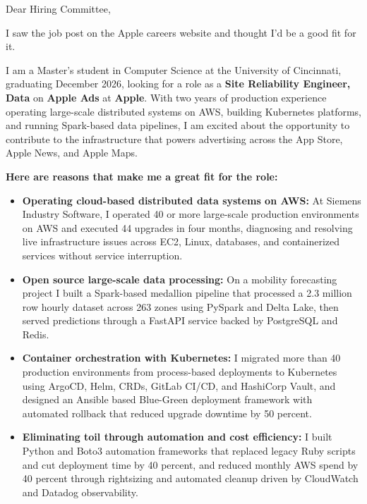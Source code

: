 \documentclass[11pt]{letter}
\date{}
\begin{document}
\begin{letter}{}

\opening{Dear Hiring Committee,}

I saw the job post on the Apple careers website and thought I'd be a good fit for it.

I am a Master's student in Computer Science at the University of Cincinnati, graduating December 2026, looking for a role as a \textbf{Site Reliability Engineer, Data} on \textbf{Apple Ads} at \textbf{Apple}. With two years of production experience operating large-scale distributed systems on AWS, building Kubernetes platforms, and running Spark-based data pipelines, I am excited about the opportunity to contribute to the infrastructure that powers advertising across the App Store, Apple News, and Apple Maps.

\textbf{Here are reasons that make me a great fit for the role:}

\begin{itemize}[leftmargin=*, itemsep=0.45em]
    \item \textbf{Operating cloud-based distributed data systems on AWS:} At Siemens Industry Software, I operated 40 or more large-scale production environments on AWS and executed 44 upgrades in four months, diagnosing and resolving live infrastructure issues across EC2, Linux, databases, and containerized services without service interruption.

    \item \textbf{Open source large-scale data processing:} On a mobility forecasting project I built a Spark-based medallion pipeline that processed a 2.3 million row hourly dataset across 263 zones using PySpark and Delta Lake, then served predictions through a FastAPI service backed by PostgreSQL and Redis.

    \item \textbf{Container orchestration with Kubernetes:} I migrated more than 40 production environments from process-based deployments to Kubernetes using ArgoCD, Helm, CRDs, GitLab CI/CD, and HashiCorp Vault, and designed an Ansible based Blue-Green deployment framework with automated rollback that reduced upgrade downtime by 50 percent.

    \item \textbf{Eliminating toil through automation and cost efficiency:} I built Python and Boto3 automation frameworks that replaced legacy Ruby scripts and cut deployment time by 40 percent, and reduced monthly AWS spend by 40 percent through rightsizing and automated cleanup driven by CloudWatch and Datadog observability.


\end{itemize}
\end{letter}
\end{document}
